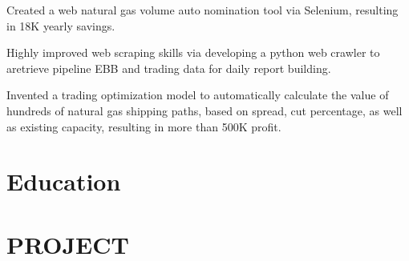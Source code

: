 \documentclass[11pt,a4paper,]{awesome-cv}
\begin{document}
\begin{cventries}
{\begin{cvitems}
\item Created a web natural gas volume auto nomination tool via Selenium, resulting in 18K yearly savings.
\item Highly improved web scraping skills via developing a python web crawler to aretrieve pipeline EBB and trading data for daily report building.
\item Invented a trading optimization model to automatically calculate the value of hundreds of natural gas shipping paths, based on spread, cut percentage, as well as existing capacity, resulting in more than 500K profit.
\end{cvitems}}
\end{cventries}

\hypertarget{education}{%
\section{Education}\label{education}}

\begin{cventries}
\end{cventries}

\hypertarget{project}{%
\section{PROJECT}\label{project}}
\end{document}
